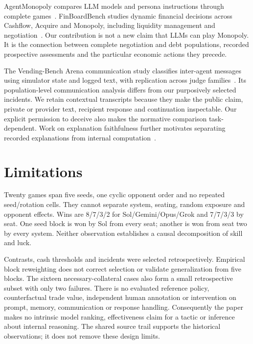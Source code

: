 AgentMonopoly compares LLM models and persona instructions through complete games~\cite{wu2026agentmonopoly}. FinBoardBench studies dynamic financial decisions across Cashflow, Acquire and Monopoly, including liquidity management and negotiation~\cite{hu2026finboardbench}. Our contribution is not a new claim that LLMs can play Monopoly. It is the connection between complete negotiation and debt populations, recorded prospective assessments and the particular economic actions they precede.

The Vending-Bench Arena communication study classifies inter-agent messages using simulator state and logged text, with replication across judge families~\cite{li2026arena}. Its population-level communication analysis differs from our purposively selected incidents. We retain contextual transcripts because they make the public claim, private or provider text, recipient response and continuation inspectable. Our explicit permission to deceive also makes the normative comparison task-dependent. Work on explanation faithfulness further motivates separating recorded explanations from internal computation~\cite{turpin2023unfaithful,lanham2023faithfulness}.

\section{Limitations}
Twenty games span five seeds, one cyclic opponent order and no repeated seed/rotation cells. They cannot separate system, seating, random exposure and opponent effects. Wins are 8/7/3/2 for Sol/Gemini/Opus/Grok and 7/7/3/3 by seat. One seed block is won by Sol from every seat; another is won from seat two by every system. Neither observation establishes a causal decomposition of skill and luck.

Contrasts, cash thresholds and incidents were selected retrospectively. Empirical block reweighting does not correct selection or validate generalization from five blocks. The sixteen necessary-collateral cases also form a small retrospective subset with only two failures. There is no evaluated reference policy, counterfactual trade value, independent human annotation or intervention on prompt, memory, communication or response handling. Consequently the paper makes no intrinsic model ranking, effectiveness claim for a tactic or inference about internal reasoning. The shared source trail supports the historical observations; it does not remove these design limits.

